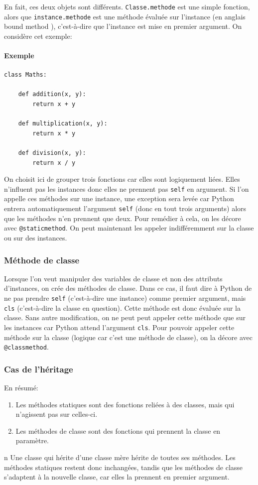 \documentclass[a4paper, 10pt]{article}
\newcommand{\code}[1]{{\small\texttt{#1}}}
\begin{document}
En fait, ces deux objets sont différents. \code{Classe.methode} est une simple fonction, alors que \code{instance.methode} est une méthode évaluée sur l'instance (en anglais \og bound method \fg{}), c'est-à-dire que l'instance est mise en premier argument. On considère cet exemple:

\paragraph{Exemple}
\begin{verbatim}
class Maths:
    
    def addition(x, y):
        return x + y

    def multiplication(x, y):
        return x * y

    def division(x, y):
        return x / y
\end{verbatim}
On choisit ici de grouper trois fonctions car elles sont logiquement liées. Elles n'influent pas les instances donc elles ne prennent pas \code{self} en argument. Si l'on appelle ces méthodes sur une instance, une exception sera levée car Python entrera automatiquement l'argument \code{self} (donc en tout trois arguments) alors que les méthodes n'en prennent que deux. Pour remédier à cela, on les décore avec \code{@staticmethod}. On peut maintenant les appeler indifféremment sur la classe ou sur des instances.

\subsubsection{Méthode de classe}
Lorsque l'on veut manipuler des variables de classe et non des attributs d'instances, on crée des méthodes de classe. Dans ce cas, il faut dire à Python de ne pas prendre \code{self} (c'est-à-dire une instance) comme premier argument, mais \code{cls} (c'est-à-dire la classe en question). Cette méthode est donc évaluée sur la classe. Sans autre modification, on ne peut peut appeler cette méthode que sur les instances car Python attend l'argument \code{cls}. Pour pouvoir appeler cette méthode sur la classe (logique car c'est une méthode de classe), on la décore avec \code{@classmethod}.

\subsubsection{Cas de l'héritage}
En résumé:
\begin{enumerate}
        \item Les méthodes statiques sont des fonctions reliées à des classes, mais qui n'agissent pas sur celles-ci.
        \item Les méthodes de classe sont des fonctions qui prennent la classe en paramètre.
\end{enumerate}
n
Une classe qui hérite d'une classe mère hérite de toutes ses méthodes. Les méthodes statiques restent donc inchangées, tandis que les méthodes de classe s'adaptent à la nouvelle classe, car elles la prennent en premier argument.
\end{document}
